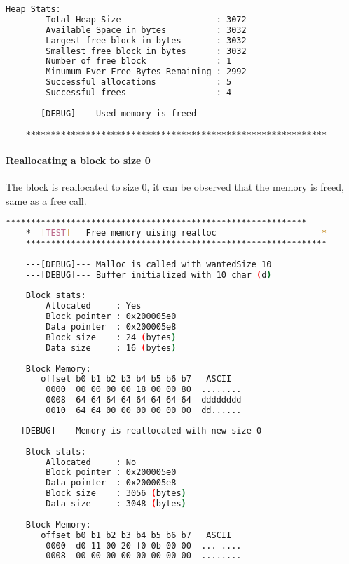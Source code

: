     \begin{outputbox}
    \begin{lstlisting}[language=bash]   
    Heap Stats:
        Total Heap Size                   : 3072
        Available Space in bytes          : 3032
        Largest free block in bytes       : 3032
        Smallest free block in bytes      : 3032
        Number of free block              : 1
        Minumum Ever Free Bytes Remaining : 2992
        Successful allocations            : 5
        Successful frees                  : 4
    
    ---[DEBUG]--- Used memory is freed
    
    ************************************************************
    \end{lstlisting}
    \end{outputbox}

    \paragraph{Reallocating a block to size 0}
    The block is reallocated to size 0, it can be observed that the memory is freed, same as a free call.

    \begin{outputbox}
    \begin{lstlisting}[language=bash]
    ************************************************************
    *  [TEST]   Free memory uising realloc                     *
    ************************************************************
        
    ---[DEBUG]--- Malloc is called with wantedSize 10
    ---[DEBUG]--- Buffer initialized with 10 char (d)
    
    Block stats:
        Allocated     : Yes
        Block pointer : 0x200005e0
        Data pointer  : 0x200005e8
        Block size    : 24 (bytes)
        Data size     : 16 (bytes)
    
    Block Memory:
       offset b0 b1 b2 b3 b4 b5 b6 b7   ASCII
        0000  00 00 00 00 18 00 00 80  ........
        0008  64 64 64 64 64 64 64 64  dddddddd
        0010  64 64 00 00 00 00 00 00  dd......
    \end{lstlisting}
    \end{outputbox}

    \begin{outputbox}
    \begin{lstlisting}[language=bash]
    ---[DEBUG]--- Memory is reallocated with new size 0
    
    Block stats:
        Allocated     : No
        Block pointer : 0x200005e0
        Data pointer  : 0x200005e8
        Block size    : 3056 (bytes)
        Data size     : 3048 (bytes)
    
    Block Memory:
       offset b0 b1 b2 b3 b4 b5 b6 b7   ASCII
        0000  d0 11 00 20 f0 0b 00 00  ... ....
        0008  00 00 00 00 00 00 00 00  ........
    \end{lstlisting}
    \end{outputbox}

